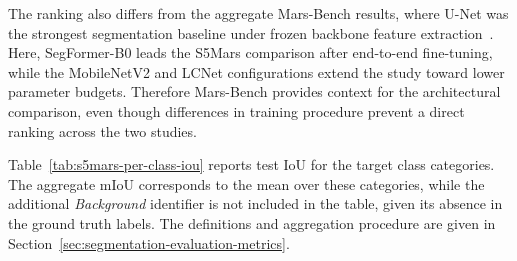 The ranking also differs from the aggregate Mars-Bench results, where U-Net was the strongest segmentation baseline under frozen backbone feature extraction~\cite{purohit2025marsbench}. Here, SegFormer-B0 leads the S5Mars comparison after end-to-end fine-tuning, while the MobileNetV2 and LCNet configurations extend the study toward lower parameter budgets. Therefore Mars-Bench provides context for the architectural comparison, even though differences in training procedure prevent a direct ranking across the two studies.

Table~\ref{tab:s5mars-per-class-iou} reports test IoU for the target class categories. The aggregate mIoU corresponds to the mean over these categories, while the additional \emph{Background} identifier is not included in the table, given its absence in the ground truth labels. The definitions and aggregation procedure are given in Section~\ref{sec:segmentation-evaluation-metrics}.


